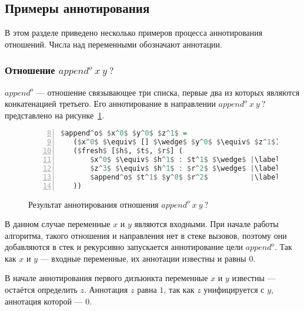 \subsection{Примеры аннотирования}

В этом разделе приведено несколько примеров процесса аннотирования отношений.
Числа над переменными обозначают аннотации.


\subsubsection{Отношение $append^o \ x \ y \ ?$}

$append^o$ --- отношение связывающее три списка, первые два из которых являются конкатенацией третьего.
Его аннотирование в направлении $append^o \ x \ y \ ?$ представлено на рисунке~\ref{lst:appendoIIOANN}.

\begin{figure}[h!]
  \begin{center}
  \begin{minipage}{0.5\textwidth}
  \begin{lstlisting}[language=Haskell, frame=single, numbers=left,numberstyle=\small, firstnumber=8, escapechar=|]
 $append^o$ $x^0$ $y^0$ $z^1$ =
   ($x^0$ $\equiv$ [] $\wedge$ $y^0$ $\equiv$ $z^1$) $\vee$ |\label{line:appendoIIOANN2}|
   ($fresh$ [$h$, $t$, $r$] (
       $x^0$ $\equiv$ $h^1$ : $t^1$ $\wedge$ |\label{line:appendoIIOANN4}|
       $z^3$ $\equiv$ $h^1$ : $r^2$ $\wedge$ |\label{line:appendoIIOANN5}|
       $append^o$ $t^1$ $y^0$ $r^2$          |\label{line:appendoIIOANN6}|
   ))
    \end{lstlisting}
  \end{minipage}
  \end{center}
  \caption{Результат аннотирования отношения $append^o \ x \ y \ ?$}
  \label{lst:appendoIIOANN}
\end{figure}

В данном случае переменные $x$ и $y$ являются входными.
При начале работы алгоритма, такого отношения и направления нет в стеке вызовов, поэтому они добавляются в стек и рекурсивно запускается аннотирование цели $append^o$.
Так как $x$ и $y$ --- входные переменные, их аннотации известны и равны $0$.

В начале аннотирования первого дизъюнкта переменные $x$ и $y$ известны --- остаётся определить $z$.
Аннотация $z$ равна $1$, так как $z$ унифицируется с $y$, аннотация которой --- $0$.

